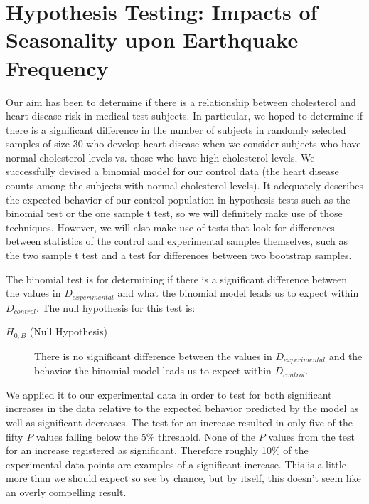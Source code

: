 \documentclass{amsart}
\begin{document}
\section{Hypothesis Testing: Impacts of Seasonality upon Earthquake Frequency}
Our aim has been to determine if there is a relationship between cholesterol and heart disease risk in medical test subjects. In particular, we hoped to determine if there is a significant difference in the number of subjects in randomly selected samples of size 30 who develop heart disease when we consider subjects who have normal cholesterol levels vs. those who have high cholesterol levels. We successfully devised a binomial model for our control data (the heart disease counts among the subjects with normal cholesterol levels). It adequately describes the expected behavior of our control population in hypothesis tests such as the binomial test or the one sample t test, so we will definitely make use of those techniques. However,  we will also make use of tests that look for differences between statistics of the control and experimental samples themselves, such as the two sample t test and a test for differences between two bootstrap samples.

The binomial test is for determining if there is a significant difference between the values in $D_{experimental}$ and what the binomial model leads us to expect within $D_{control}$. The null hypothesis for this test is:
\begin{description}
\item[$H_{0,B}$ (Null Hypothesis)] There is no significant difference between the values in $D_{experimental}$ and the behavior the binomial model leads us to expect within $D_{control}$.
\end{description} 
We applied it to our experimental data in order to test for both significant increases in the data relative to the expected behavior predicted by the model as well as significant decreases. The test for an increase resulted in only five of the fifty $P$ values falling below the 5\% threshold. None of the $P$ values from the test for an increase registered as significant. Therefore roughly 10\% of the experimental data points are examples of a significant increase. This is a little more than we should expect so see by chance, but by itself, this doesn't seem like an overly compelling result. 
\end{document}
